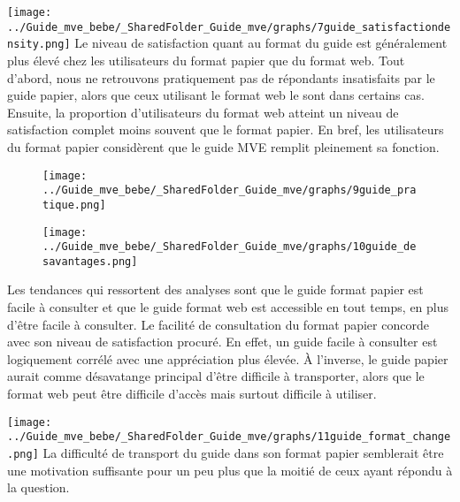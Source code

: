 \documentclass[
]{article}
\begin{document}
\texttt{[image: ../Guide\_mve\_bebe/\_SharedFolder\_Guide\_mve/graphs/7guide\_satisfactiondensity.png]}
Le niveau de satisfaction quant au format du guide est généralement plus
élevé chez les utilisateurs du format papier que du format web. Tout
d'abord, nous ne retrouvons pratiquement pas de répondants insatisfaits
par le guide papier, alors que ceux utilisant le format web le sont dans
certains cas. Ensuite, la proportion d'utilisateurs du format web
atteint un niveau de satisfaction complet moins souvent que le format
papier. En bref, les utilisateurs du format papier considèrent que le
guide MVE remplit pleinement sa fonction.

\newpage
\begin{figure}[htbp]
  \centering
  \begin{minipage}{0.5\textwidth}
    \texttt{[image: ../Guide\_mve\_bebe/\_SharedFolder\_Guide\_mve/graphs/9guide\_pratique.png]}
  \end{minipage}%
  \begin{minipage}{0.5\textwidth}
    \texttt{[image: ../Guide\_mve\_bebe/\_SharedFolder\_Guide\_mve/graphs/10guide\_desavantages.png]}
  \end{minipage}
\end{figure}

\vspace{10pt}

\begin{minipage}{1.0\textwidth}
  \textbf{} 
Les tendances qui ressortent des analyses sont que le guide format papier est facile à consulter et que le guide format web est accessible en tout temps, en plus d’être facile à consulter. Le facilité de consultation du format papier concorde avec son niveau de satisfaction procuré. En effet, un guide facile à consulter est logiquement corrélé avec une appréciation plus élevée. À l'inverse, le guide papier aurait comme désavatange principal d'être difficile à transporter, alors que le format web peut être difficile d'accès mais surtout difficile à utiliser.
\end{minipage}

\vspace{10pt}

\texttt{[image: ../Guide\_mve\_bebe/\_SharedFolder\_Guide\_mve/graphs/11guide\_format\_change.png]}
\newline La difficulté de transport du guide dans son format papier
semblerait être une motivation suffisante pour un peu plus que la moitié
de ceux ayant répondu à la question.
\end{document}
